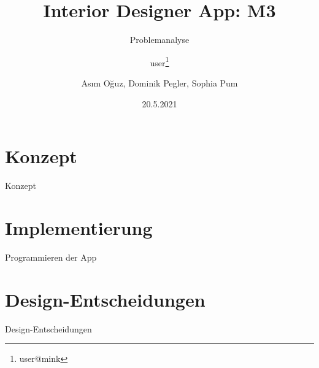 \documentclass[presentation,bigger,aspectratio=169]{beamer}
\author{user\thanks{user@mink}}
\date{20.5.2021}
\title{Interior Designer App: M3}
\subtitle{Problemanalyse}
\author[A.Oğuz, D.Pegler, S.Pum]{Asım Oğuz, Dominik Pegler, Sophia Pum}
\institute{Universität Wien, Fakultät für Informatik (SS2021)}
\begin{document}
\maketitle

\section{Konzept}
\label{sec:org0337b2e}

\begin{frame}[label={sec:orgf02c486}]{\vspace{2.2cm}\begin{center}\MakeUppercase{\insertsection}\end{center}}
\end{frame}

\begin{frame}[label={sec:org579d329}]{Konzept}
\end{frame}

\section{Implementierung}
\label{sec:org3b9130a}
\begin{frame}[label={sec:orgae637a4}]{\vspace{2.2cm}\begin{center}\MakeUppercase{\insertsection}\end{center}}
\end{frame}

\begin{frame}[label={sec:orgfcdcd0a}]{Programmieren der App}
\end{frame}
\section{Design-Entscheidungen}
\label{sec:org3c8f642}
\begin{frame}[label={sec:orgb90f85b}]{\vspace{2.2cm}\begin{center}\MakeUppercase{\insertsection}\end{center}}
\end{frame}

\begin{frame}[label={sec:orge8e3fac}]{Design-Entscheidungen}
\end{frame}
\appendix
\end{document}
